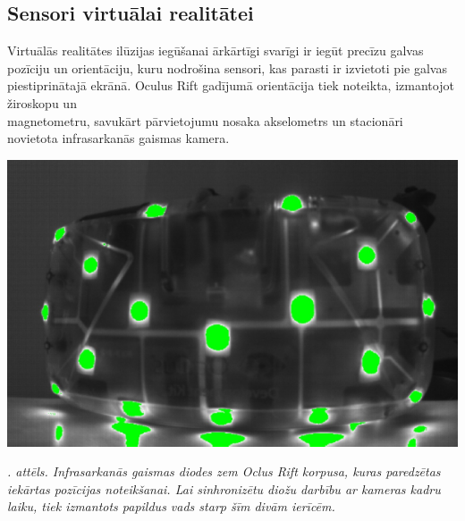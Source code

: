 \documentclass[12pt, a4paper, oneside, openright]{article}
\renewcommand{\thecimages}{\arabic{cimages}}
\begin{document}
\newpage
\subsection{Sensori virtuālai realitātei}\label{sensors_vr}

\par
Virtuālās realitātes ilūzijas iegūšanai ārkārtīgi svarīgi ir iegūt precīzu galvas pozīciju un
orientāciju, kuru nodrošina sensori, kas parasti ir izvietoti pie galvas piestiprinātajā ekrānā.
Oculus Rift gadījumā orientācija tiek noteikta, izmantojot žiroskopu un \\ magnetometru, 
savukārt pārvietojumu nosaka akselometrs un stacionāri novietota infrasarkanās gaismas kamera.

\label{cimages:TrackingCameraGood}
\vspace{10pt}
\begin{samepage}
\begin{center}
\includegraphics[width=0.5\columnwidth]{images/a6.png}
\begin{center}
\footnotesize{
\textit{\thecimages. attēls. Infrasarkanās gaismas diodes zem Oclus Rift korpusa, kuras paredzētas iekārtas pozīcijas noteikšanai. 
Lai sinhronizētu diožu darbību ar kameras kadru laiku, tiek izmantots papildus vads starp šīm divām ierīcēm.}}
\end{center}
\end{center}
\end{samepage}
\end{document}

